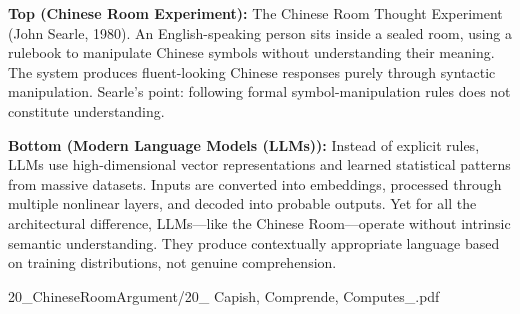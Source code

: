 \begin{SideNotePage}{
  \textbf{Top (Chinese Room Experiment):} The Chinese Room Thought Experiment (John Searle, 1980). An English-speaking person sits inside a sealed room, using a rulebook to manipulate Chinese symbols without understanding their meaning. The system produces fluent-looking Chinese responses purely through syntactic manipulation. Searle’s point: following formal symbol-manipulation rules does not constitute understanding. \par
  \textbf{Bottom (Modern Language Models (LLMs)):} Instead of explicit rules, LLMs use high-dimensional vector representations and learned statistical patterns from massive datasets. Inputs are converted into embeddings, processed through multiple nonlinear layers, and decoded into probable outputs. Yet for all the architectural difference, LLMs—like the Chinese Room—operate without intrinsic semantic understanding. They produce contextually appropriate language based on training distributions, not genuine comprehension. \par
}{20_ChineseRoomArgument/20_ Capish, Comprende, Computes_.pdf}
\end{SideNotePage}
